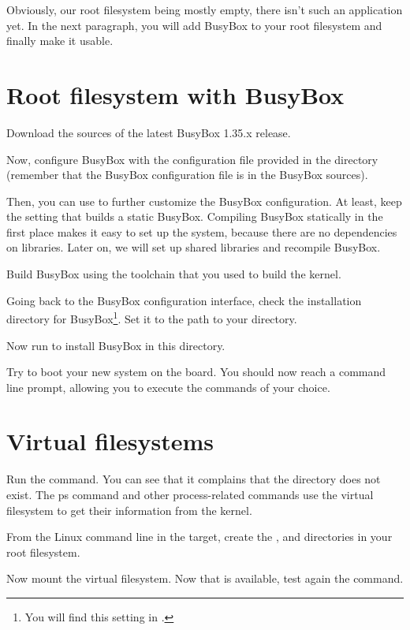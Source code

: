 Obviously, our root filesystem being mostly empty, there isn't such an
application yet. In the next paragraph, you will add BusyBox to your root
filesystem and finally make it usable.

\section{Root filesystem with BusyBox}

Download the sources of the latest BusyBox 1.35.x release.

Now, configure BusyBox with the configuration file provided in the
 directory (remember that the BusyBox configuration file
is  in the BusyBox sources).

Then, you can use  to further customize
the BusyBox configuration. At least, keep the setting that
builds a static BusyBox. Compiling BusyBox statically in the first
place makes it easy to set up the system, because there are no dependencies
on libraries. Later on, we will set up shared libraries and recompile BusyBox.

Build BusyBox using the toolchain that you used to build the kernel.

Going back to the BusyBox configuration interface,
check the installation directory for BusyBox\footnote{You will find
this setting in .}.
Set it to the path to your  directory.

Now run  to install BusyBox in this directory.

Try to boot your new system on the board. You should now reach a
command line prompt, allowing you to execute the commands of your
choice.

\section{Virtual filesystems}

Run the  command. You can see that it complains that the
 directory does not exist. The ps command and other
process-related commands use the  virtual filesystem to get
their information from the kernel.

From the Linux command line in the target, create the ,
 and  directories in your root filesystem.

Now mount the  virtual filesystem. Now that  is
available, test again the  command.

